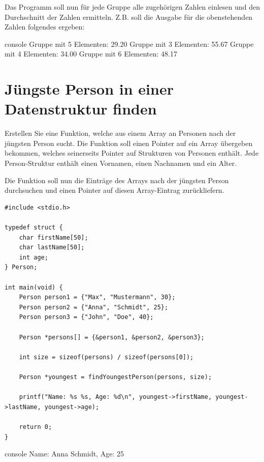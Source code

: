 Das Programm soll nun für jede Gruppe alle zugehörigen Zahlen einlesen und den
Durchschnitt der Zahlen ermitteln. Z.B. soll die Ausgabe für die obenstehenden
Zahlen folgendes ergeben:

\begin{mybox}[Bildschirmausgabe]{console}
Gruppe mit 5 Elementen: 29.20
Gruppe mit 3 Elementen: 55.67
Gruppe mit 4 Elementen: 34.00
Gruppe mit 6 Elementen: 48.17
\end{mybox}




\chapter{Jüngste Person in einer Datenstruktur finden}

\vspace{10pt}

Erstellen Sie eine Funktion, welche aus einem Array an Personen nach der
jüngsten Person sucht. Die Funktion soll einen Pointer auf ein Array übergeben
bekommen, welches seinerseits Pointer auf Strukturen von Personen enthält. Jede
Person-Struktur enthält einen Vornamen, einen Nachnamen und ein Alter.

Die Funktion soll nun die Einträge des Arrays nach der jüngsten Person
durchsuchen und einen Pointer auf diesen Array-Eintrag zurückliefern.

\Vorlage
\begin{verbatim}
#include <stdio.h>

typedef struct {
    char firstName[50];
    char lastName[50];
    int age;
} Person;

int main(void) {
    Person person1 = {"Max", "Mustermann", 30};
    Person person2 = {"Anna", "Schmidt", 25};
    Person person3 = {"John", "Doe", 40};

    Person *persons[] = {&person1, &person2, &person3};

    int size = sizeof(persons) / sizeof(persons[0]);

    Person *youngest = findYoungestPerson(persons, size);

    printf("Name: %s %s, Age: %d\n", youngest->firstName, youngest->lastName, youngest->age);

    return 0;
}
\end{verbatim}

\begin{mybox}[Bildschirmausgabe]{console}
Name: Anna Schmidt, Age: 25
\end{mybox}


